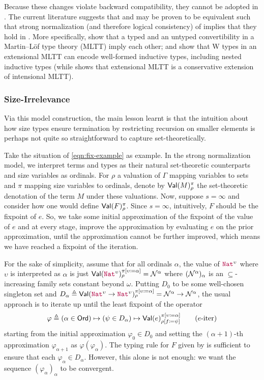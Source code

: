 Because these changes violate backward compatibility, they cannot be adopted in \lang.
The current literature suggests that \langAnother and \lang may be proven to be equivalent
such that strong normalization (and therefore logical consistency) of \langAnother implies that they hold in \lang.
More specifically, \cite{conversion} show that a typed and an untyped convertibility in a Martin--L\"of type theory (MLTT) imply each other;
and \citet{w-types, polynomial-functors-w} show that W types in an extensional MLTT
can encode well-formed inductive types, including nested inductive types
(while \citet{hofmann} shows that extensional MLTT is a conservative extension of intensional MLTT).

\subsubsection{Size-Irrelevance}
%
Via this model construction, the main lesson learnt is
that the intuition about how size types ensure termination by
restricting recursion on smaller elements is perhaps not quite so
straightforward to capture set-theoretically.

Take the situation of \eqref{eqn:fix-example} as example.
%
In the strong normalization model, we interpret terms and types as
their natural set-theoretic counterparts and size variables as
ordinals.
%
For $\rho$ a valuation of $\Gamma$ mapping variables to sets and $\pi$
mapping size variables to ordinals, denote by $\textsf{Val}(M)_\rho^\pi$ the
set-theoretic denotation of the term $M$ under these valuations.
%
Now, suppose $s=\infty$ and consider how one would define
$\textsf{Val}(F)_\rho^\pi$.
%
Since $s=\infty$, intuitively, $F$ should be the fixpoint of $e$.
%
So, we take some initial approximation of the fixpoint of the value of
$e$ and at every stage, improve the approximation by evaluating $e$ on
the prior approximation, until the approximation cannot be further
improved, which means we have reached a fixpoint of the iteration.

For the sake of simplicity, assume that for all ordinals $\alpha$, the
value of $\Nat^\upsilon$ where $\upsilon$ is interpreted as $\alpha$
is just
$\Val(\Nat^\upsilon)_\rho^{\subst{\pi}{\upsilon}{\alpha}} =
\McN^\alpha$ where $(\mathcal{N}^\alpha)_\alpha$ is an $\subseteq$-increasing
family sets constant beyond $\omega$.
%
Putting $D_0$ to be some well-chosen singleton set and
$D_\alpha \triangleq \Val(\Nat^\upsilon \to
\Nat^\upsilon)_\rho^{\subst{\pi}{\upsilon}{\alpha}} = \McN^\alpha \to
\McN^\alpha$, the usual approach is to iterate up until the least
fixpoint of the operator
%
\begin{align*}
  \varphi \triangleq
  (\alpha \in \Ord) \mapsto (\psi \in D_\alpha) \mapsto \Val(e)_{\subst{\rho}{f}{\psi}}^{\subst{\pi}{\upsilon}{\alpha}}
  \tag{$e$-iter}\label{eqn:e-iter}
\end{align*}
%
starting from the initial approximation $\varphi_0 \in D_0$ and
setting the $(\alpha+1)$-th approximation $\varphi_{\alpha+1}$ as
$\varphi(\varphi_\alpha)$.
%
The typing rule for $F$ given by  is sufficient
to ensure that each $\varphi_\alpha \in D_\alpha$.
%
However, this alone is not enough: we want the sequence
$(\varphi_\alpha)_\alpha$ to be convergent.

